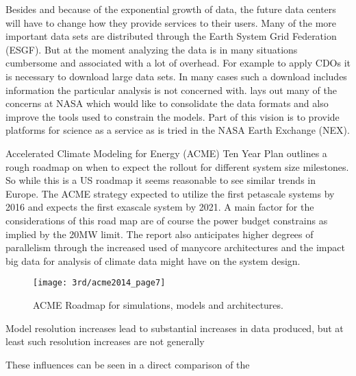




Besides and because of the exponential growth of data, the future data centers will have to change how they provide services to their users.
Many of the more important data sets are distributed through the Earth System Grid Federation (ESGF).
But at the moment analyzing the data is in many situations cumbersome and associated with a lot of overhead.
For example to apply CDOs it is necessary to download large data sets.
In many cases such a  download includes information the particular analysis is not concerned with.
\cite{tsengdar_lee_challenging_2013} lays out many of the concerns at NASA which would like to consolidate the data formats and also improve the tools used to constrain the models.
Part of this vision is to provide platforms for science as a service as is tried in the NASA Earth Exchange (NEX).






Accelerated Climate Modeling for Energy (ACME) Ten Year Plan outlines a rough roadmap\cite{bader_accelerated_2014} on when to expect the rollout for different system size milestones. So while this is a US roadmap it seems reasonable to see similar trends in Europe.
The ACME strategy expected to utilize the first petascale systems by 2016 and expects the first exascale system by 2021.
A main factor for the considerations of this road map are of course the power budget constrains as implied by the 20MW limit.
The report also anticipates higher degrees of parallelism through the increased used of manycore architectures and the impact big data for analysis of climate data might have on the system design.


\begin{figure}[]
	\centering
	\texttt{[image: 3rd/acme2014\_page7]}
	\caption{ACME Roadmap for simulations, models and architectures. \cite{bader_accelerated_2014}}
	\label{fig:acme roadmap}
\end{figure}



Model resolution increases lead to substantial increases in data produced, but at least such resolution increases are not generally


These influences can be seen in a direct comparison of the 



